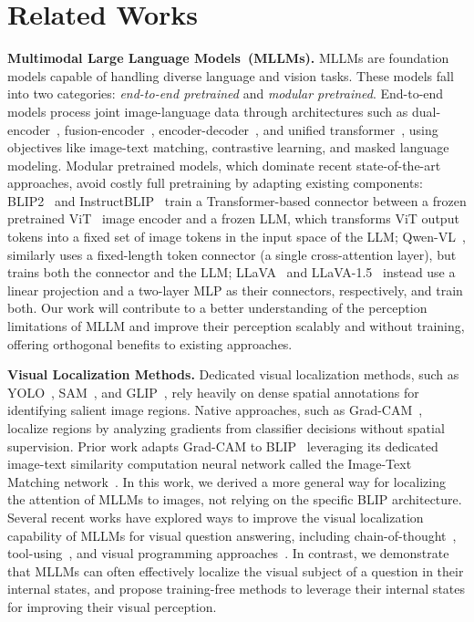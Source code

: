 \section{Related Works}
\label{sec:related_works}

\textbf{Multimodal Large Language Models~(MLLMs).}
MLLMs are foundation models capable of handling diverse language and vision tasks. These models fall into two categories: \emph{end-to-end pretrained} and \emph{modular pretrained}. End-to-end models process joint image-language data through architectures such as dual-encoder~\citep{clip}, fusion-encoder~\citep{li2021align-before-fuse}, encoder-decoder~\citep{cho2021unifying}, and unified transformer~\citep{wang2022image-as-foreign-lang}, using objectives like image-text matching, contrastive learning, and masked language modeling. Modular pretrained models, which dominate recent state-of-the-art approaches, avoid costly full pretraining by adapting existing components: 
BLIP2~\citep{li2023blip} and InstructBLIP~\citep{instructblip} train a Transformer-based connector between a frozen pretrained ViT~\citep{vit} image encoder and a frozen LLM, which transforms ViT output tokens into a fixed set of image tokens in the input space of the LLM; Qwen-VL~\citep{qwen-vl}, similarly uses a fixed-length token connector (a single cross-attention layer), but trains both the connector and the LLM; LLaVA~\citep{llava} and LLaVA-1.5~\citep{llava1.5} instead use a linear projection and a two-layer MLP as their connectors, respectively, and train both.
Our work will contribute to a better understanding of the perception limitations of MLLM and improve their perception scalably and without training, offering orthogonal benefits to existing approaches.

\textbf{Visual Localization Methods.}
Dedicated visual localization methods, such as YOLO~\citep{yolo}, SAM~\citep{kirillov2023segment}, and GLIP~\citep{glip}, rely heavily on dense spatial annotations for identifying salient image regions. Native approaches, such as Grad-CAM~\citep{gradcam}, localize regions by analyzing gradients from classifier decisions without spatial supervision. Prior work adapts Grad-CAM to BLIP~\citep{blip} leveraging its dedicated image-text similarity computation neural network called the Image-Text Matching network~\citep{pnpvqa,pnpvqa2}. In this work, we derived a more general way for localizing the attention of MLLMs to images, not relying on the specific BLIP architecture. Several recent works have explored ways to improve the visual localization capability of MLLMs for visual question answering, including chain-of-thought~\citep{visualcot,llavaplus}, tool-using~\citep{v-star}, and visual programming approaches~\citep{suris2023vipergpt,visualprogramming}. In contrast, we demonstrate that MLLMs can often effectively localize the visual subject of a question in their internal states, and propose training-free methods to leverage their internal states for improving their visual perception.

